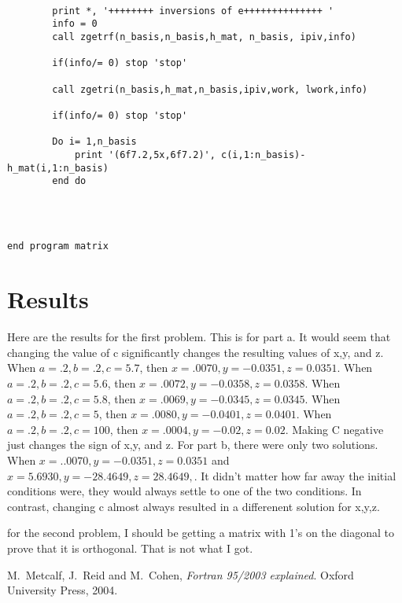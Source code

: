 \documentclass[12pt]{article}
\begin{document}
\begin{lstlisting}[frame=single,caption={ {\tt mtestthisone.f95}},label=module]
        
        print *, '++++++++ inversions of e++++++++++++++ '
        info = 0
        call zgetrf(n_basis,n_basis,h_mat, n_basis, ipiv,info)
        
        if(info/= 0) stop 'stop'
        
        call zgetri(n_basis,h_mat,n_basis,ipiv,work, lwork,info)
        
        if(info/= 0) stop 'stop'
        
        Do i= 1,n_basis
            print '(6f7.2,5x,6f7.2)', c(i,1:n_basis)-h_mat(i,1:n_basis)
        end do 
            
 
     

end program matrix

\end{lstlisting}



\section{Results}

Here are the results for the first problem. This is for part a. It would seem that changing the value of c significantly changes the resulting values of x,y, and z. When $a=.2,b=.2,c=5.7$, then $x=.0070,y=-0.0351,z=0.0351$. When $a=.2,b=.2,c=5.6$, then $x=.0072,y=-0.0358,z=0.0358$. When $a=.2,b=.2,c=5.8$, then $x=.0069,y=-0.0345,z=0.0345$. When $a=.2,b=.2,c=5$, then $x=.0080,y=-0.0401,z=0.0401$. When $a=.2,b=.2,c=100$, then $x=.0004,y=-0.02,z=0.02$. Making C negative just changes the sign of x,y, and z. For part b, there were only two solutions. When $x=..0070,y=-0.0351,z=0.0351$ and $x=5.6930,y=-28.4649,z=28.4649,$. It didn't matter how far away the initial conditions were, they would always settle to one of the two conditions. In contrast, changing c almost always resulted in a differenent solution for x,y,z.

for the second problem, I should be getting a matrix with 1's on the diagonal to prove that it is orthogonal. That is not what I got.



\begin{thebibliography}{}


 M.\ Metcalf, J.\ Reid and M.\ Cohen, {\it Fortran 95/2003 explained}. Oxford University Press, 2004.
 

\end{thebibliography}
\end{document}
